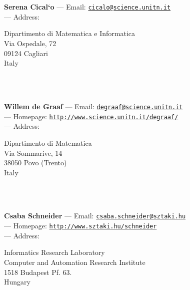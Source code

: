 \documentclass[a4paper,11pt]{report}
\begin{document}
\begin{titlepage}
\mbox{}\\
{\mbox{}\\
\small \noindent \textbf{ Serena Cical{\a`o}   } --- Email: \href{mailto://cicalo@science.unitn.it} {\texttt{cicalo@science.unitn.it}}\\
 --- Address: \begin{minipage}[t]{8cm}\noindent
 Dipartimento di Matematica e Informatica\\
 Via Ospedale, 72\\
 09124 Cagliari\\
 Italy\\
 \end{minipage}
}\\
{\mbox{}\\
\small \noindent \textbf{ Willem de Graaf    } --- Email: \href{mailto://degraaf@science.unitn.it} {\texttt{degraaf@science.unitn.it}}\\
 --- Homepage: \href{http://www.science.unitn.it/~degraaf/} {\texttt{http://www.science.unitn.it/\texttt{}degraaf/}}\\
 --- Address: \begin{minipage}[t]{8cm}\noindent
 Dipartimento di Matematica\\
 Via Sommarive, 14\\
 38050 Povo (Trento)\\
 Italy\\
 \end{minipage}
}\\
{\mbox{}\\
\small \noindent \textbf{ Csaba Schneider    } --- Email: \href{mailto://csaba.schneider@sztaki.hu} {\texttt{csaba.schneider@sztaki.hu}}\\
 --- Homepage: \href{http://www.sztaki.hu/~schneider} {\texttt{http://www.sztaki.hu/\texttt{}schneider}}\\
 --- Address: \begin{minipage}[t]{8cm}\noindent
 Informatics Research Laboratory\\
 Computer and Automation Research Institute\\
 1518 Budapest Pf. 63.\\
 Hungary \end{minipage}
}\\
\end{titlepage}
\end{document}
